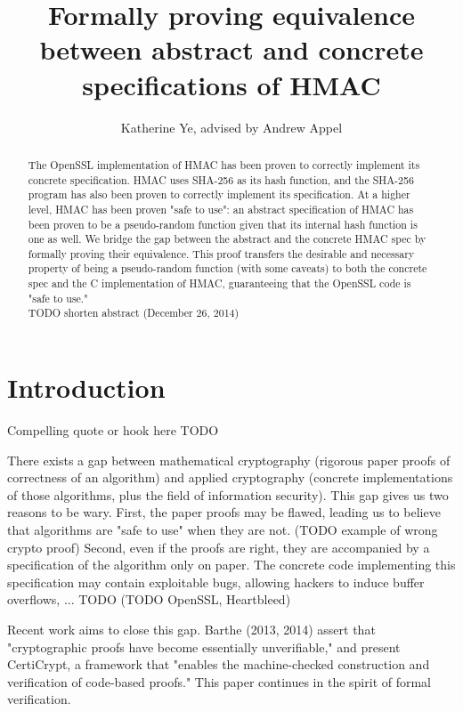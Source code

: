 \documentclass[twocolumn,showpacs,%
  nofootinbib,aps,superscriptaddress,%
  eqsecnum,prd,notitlepage,showkeys,10pt]{revtex4-1}
\begin{document}
\title{Formally proving equivalence between abstract and concrete specifications of HMAC}
\author{Katherine Ye, advised by Andrew Appel}

\begin{abstract}
The OpenSSL implementation of HMAC has been proven to correctly implement its concrete specification. HMAC uses SHA-256 as its hash function, and the SHA-256 program has also been proven to correctly implement its specification. At a higher level, HMAC has been proven "safe to use": an abstract specification of HMAC has been proven to be a pseudo-random function given that its internal hash function is one as well. We bridge the gap between the abstract and the concrete HMAC spec by formally proving their equivalence. This proof transfers the desirable and necessary property of being a pseudo-random function (with some caveats) to both the concrete spec and the C implementation of HMAC, guaranteeing that the OpenSSL code is "safe to use."
\\
TODO shorten abstract (December 26, 2014)

\end{abstract}

\maketitle


\section{Introduction}

Compelling quote or hook here TODO

There exists a gap between mathematical cryptography (rigorous paper proofs of correctness of an algorithm) and applied cryptography (concrete implementations of those algorithms, plus the field of information security). This gap gives us two reasons to be wary. First, the paper proofs may be flawed, leading us to believe that algorithms are "safe to use" when they are not. (TODO example of wrong crypto proof) Second, even if the proofs are right, they are accompanied by a specification of the algorithm only on paper. The concrete code implementing this specification may contain exploitable bugs, allowing hackers to induce buffer overflows, ... TODO (TODO OpenSSL, Heartbleed) 

Recent work aims to close this gap. Barthe (2013, 2014) assert that "cryptographic proofs have become essentially unverifiable," and present CertiCrypt, a framework that "enables the machine-checked
construction and verification of code-based proofs." This paper continues in the spirit of formal verification. 
\end{document}
